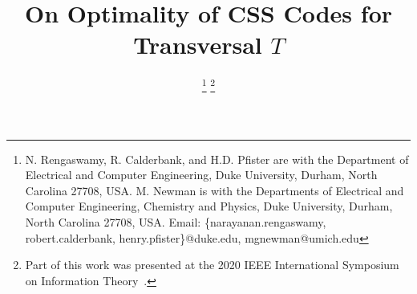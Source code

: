 \documentclass[twoside,romanappendices]{IEEEtran}
\newcommand{\red}[1]{{\color{red}#1}}
\begin{document}
\title{On Optimality of CSS Codes for Transversal $T$}

 \author{%
   \thanks{N. Rengaswamy, R. Calderbank, and H.D. Pfister are with the
           Department of Electrical and Computer Engineering,
           Duke University,
           Durham, North Carolina 27708, USA.
           M. Newman is with the Departments of Electrical and Computer Engineering, Chemistry and Physics,
           Duke University,
           Durham, North Carolina 27708, USA.
           Email: \{narayanan.rengaswamy, robert.calderbank, henry.pfister\}@duke.edu, mgnewman@umich.edu}%
    \thanks{Part of this work was presented at the 2020 IEEE International Symposium on Information Theory~\cite{Rengaswamy-isit20}.}
  }


  


{\maketitle}
\end{document}
